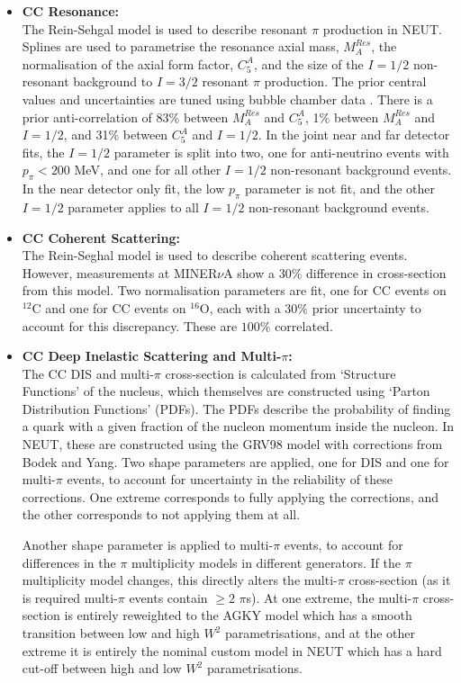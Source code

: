 \begin{itemize}
\item \textbf{CC Resonance:}\\
The Rein-Sehgal model\cite{reinessehgal} is used to describe resonant $\pi$ production in NEUT. Splines are used to parametrise the resonance axial mass, $M^{Res}_{A}$, the normalisation of the axial form factor, $C^{A}_{5}$, and the size of the $I=1/2$ non-resonant background to $I=3/2$ resonant $\pi$ production. The prior central values and uncertainties are tuned using bubble chamber data \cite{bubblechamber}. There is a prior anti-correlation of 83$\%$ between $M^{Res}_{A}$ and $C^{A}_{5}$, 1$\%$ between $M^{Res}_{A}$ and $I=1/2$, and 31$\%$ between $C^{A}_{5}$ and $I=1/2$. In the joint near and far detector fits, the $I=1/2$ parameter is split into two, one for anti-neutrino events with $p_{\pi} < 200$ MeV, and one for all other $I=1/2$ non-resonant background events. In the near detector only fit, the low $p_{\pi}$ parameter is not fit, and the other $I=1/2$ parameter applies to all $I=1/2$ non-resonant background events.

\item \textbf{CC Coherent Scattering:}\\
The Rein-Seghal model \cite{reincoh} is used to describe coherent scattering events.
However, measurements at MINER$\nu$A show a $30\%$ difference in cross-section from this model. Two normalisation parameters are fit, one for CC events on $^{12}$C and one for CC events on $^{16}$O, each with a $30\%$ prior uncertainty to account for this discrepancy. These are $100\%$ correlated.

\item \textbf{CC Deep Inelastic Scattering and Multi-$\pi$:}\\
The CC DIS and multi-$\pi$ cross-section is calculated from `Structure Functions' of the nucleus, which themselves are constructed using `Parton Distribution Functions' (PDFs). The PDFs describe the probability of finding a quark with a given fraction of the nucleon momentum inside the nucleon. In NEUT, these are constructed using the GRV98\cite{grv98} model with corrections from Bodek and Yang\cite{by}. Two shape parameters are applied, one for DIS and one for multi-$\pi$ events, to account for uncertainty in the reliability of these corrections. One extreme corresponds to fully applying the corrections, and the other corresponds to not applying them at all.

Another shape parameter is applied to multi-$\pi$ events, to account for differences in the $\pi$ multiplicity models in different generators. If the $\pi$ multiplicity model changes, this directly alters the multi-$\pi$ cross-section (as it is required multi-$\pi$ events contain $\geq2$ $\pi$s). At one extreme, the multi-$\pi$ cross-section is entirely reweighted to the AGKY model\cite{agky} which has a smooth transition between low and high $W^2$ parametrisations, and at the other extreme it is entirely the nominal custom model in NEUT which has a hard cut-off between high and low $W^2$ parametrisations.


\end{itemize}
